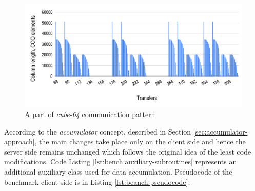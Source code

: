 \begin{figure}[htpb]
  \centering
  \includegraphics[width=1.0\textwidth]{figures/chapter-3/communication-pattern.png}
  \caption{A part of \textit{cube-64} communication pattern} \label{fig:communication-pattern}
\end{figure}


According to the \textit{accumulator} concept, described in Section \ref{sec:accumulator-approach}, the main changes take place only on the client side and hence the server side remains unchanged which follows the original idea of the least code modifications. Code Listing \ref{lst:bench:auxiliary-subroutines} represents an additional auxiliary class used for data accumulation. Pseudocode of the benchmark client side is in Listing \ref{lst:beanch:pseudocode}.\\ 


